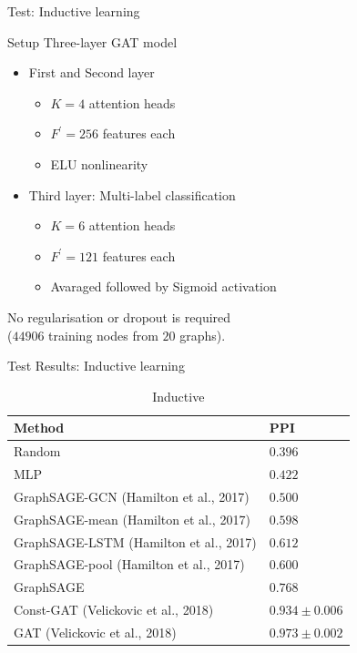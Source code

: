 \documentclass{beamer}
\theoremstyle{definition}
\begin{document}
\begin{frame}{Test: Inductive learning}
    \begin{block}{Setup}
        Three-layer GAT model
        \begin{itemize}
            \item First and Second layer
                \begin{itemize}
                    \item \(K = 4\) attention heads
                    \item \(F^\prime = 256\) features each
                    \item ELU nonlinearity
                \end{itemize}
            \item Third layer: Multi-label classification
                \begin{itemize}
                    \item \(K = 6\) attention heads
                    \item \(F^\prime = 121\) features each
                    \item Avaraged followed by Sigmoid activation
                \end{itemize}
        \end{itemize}
        No regularisation or dropout is required\\
        (\(44906\) training nodes from \(20\) graphs).
    \end{block}
\end{frame}

\begin{frame}{Test Results: Inductive learning}
    \begin{small}
    \begin{table}
      \caption{Inductive}
      \label{table:2}
      \begin{tabular}{ l l }
        \hline
        Method & PPI \\
        \hline
        Random & $0.396$ \\
        MLP & $0.422$ \\
        GraphSAGE-GCN (Hamilton et al., 2017) & $0.500$ \\
        GraphSAGE-mean (Hamilton et al., 2017) & $0.598$ \\
        GraphSAGE-LSTM (Hamilton et al., 2017) & $0.612$ \\
        GraphSAGE-pool (Hamilton et al., 2017) & $0.600$ \\
        \hline
        GraphSAGE & $0.768$ \\
        Const-GAT (Velickovic et al., 2018) & $0.934\pm0.006$ \\
        GAT (Velickovic et al., 2018) & $0.973\pm0.002$ \\
        \hline
      \end{tabular}
    \end{table}
    \end{small}
\end{frame}
\end{document}

